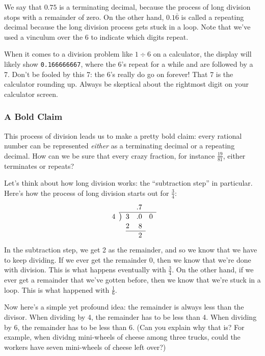 We say that $0.75$ is a terminating decimal, because the process of long division stops with a remainder of zero. On the other hand, $0.1\overline{6}$ is called a repeating decimal because the long division process gets stuck in a loop. Note that we've used a vinculum over the 6 to indicate which digits repeat.

When it comes to a division problem like $1 \div 6$ on a calculator, the display will likely show \texttt{0.166666667}, where the 6's repeat for a while and are followed by a 7. Don't be fooled by this 7: the 6's really do go on forever! That 7 is the calculator rounding up. Always be skeptical about the rightmost digit on your calculator screen.

\subsubsection{A Bold Claim}

This process of division leads us to make a pretty bold claim: every rational number can be represented \textit{either} as a terminating decimal or a repeating decimal. How can we be sure that every crazy fraction, for instance $\frac{19}{81}$, either terminates or repeats?

Let's think about how long division works: the ``subtraction step'' in particular. Here's how the process of long division starts out for $\frac{3}{4}$:
\[
\renewcommand\arraystretch{1.1}
\begin{array}{*1r @{\hskip\arraycolsep}c@{\hskip\arraycolsep} *3r}
	&&			& .7	&	\\
\cline{2-5}
4	&\big)&	3	& .0	& 0 \\
	&&		2	&8		\\
\cline{3-4}
	&&			&2 & 	\\
\end{array}
\]
In the subtraction step, we get 2 as the remainder, and so we know that we have to keep dividing. If we ever get the remainder 0, then we know that we're done with division. This is what happens eventually with $\frac{3}{4}$. On the other hand, if we ever get a remainder that we've gotten before, then we know that we're stuck in a loop. This is what happened with $\frac{1}{6}$.

Now here's a simple yet profound idea: the remainder is always less than the divisor. When dividing by 4, the remainder has to be less than 4. When dividing by 6, the remainder has to be less than 6. (Can you explain why that is? For example, when dividng mini-wheels of cheese among three trucks, could the workers have seven mini-wheels of cheese left over?)

